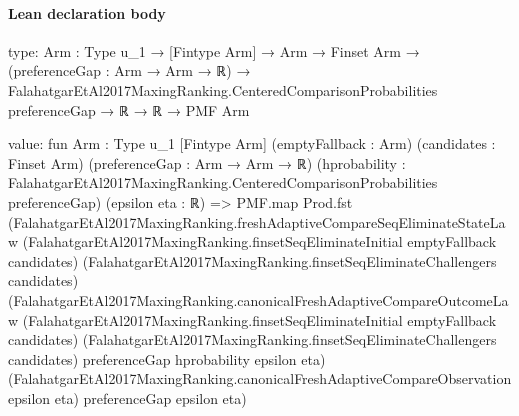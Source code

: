 \documentclass[10pt]{article}
\begin{document}
\paragraph{Lean declaration body}
\begin{ReviewVerbatim}
type:
{Arm : Type u_1} →
  [Fintype Arm] →
    Arm →
      Finset Arm →
        (preferenceGap : Arm → Arm → ℝ) →
          FalahatgarEtAl2017MaxingRanking.CenteredComparisonProbabilities preferenceGap → ℝ → ℝ → PMF Arm

value:
fun {Arm : Type u_1} [Fintype Arm] (emptyFallback : Arm) (candidates : Finset Arm) (preferenceGap : Arm → Arm → ℝ)
    (hprobability : FalahatgarEtAl2017MaxingRanking.CenteredComparisonProbabilities preferenceGap) (epsilon eta : ℝ) =>
  PMF.map Prod.fst
    (FalahatgarEtAl2017MaxingRanking.freshAdaptiveCompareSeqEliminateStateLaw
      (FalahatgarEtAl2017MaxingRanking.finsetSeqEliminateInitial emptyFallback candidates)
      (FalahatgarEtAl2017MaxingRanking.finsetSeqEliminateChallengers candidates)
      (FalahatgarEtAl2017MaxingRanking.canonicalFreshAdaptiveCompareOutcomeLaw
        (FalahatgarEtAl2017MaxingRanking.finsetSeqEliminateInitial emptyFallback candidates)
        (FalahatgarEtAl2017MaxingRanking.finsetSeqEliminateChallengers candidates) preferenceGap hprobability epsilon
        eta)
      (FalahatgarEtAl2017MaxingRanking.canonicalFreshAdaptiveCompareObservation epsilon eta) preferenceGap epsilon eta)
\end{ReviewVerbatim}
\end{document}
